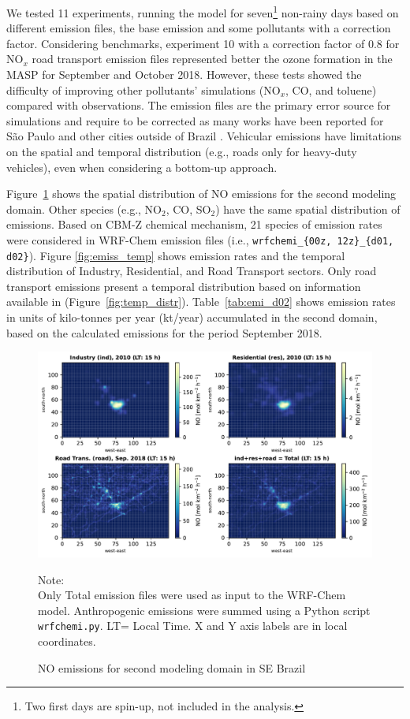    We tested 11 experiments, running the model for seven\footnote{Two first days are spin-up, not included in the analysis.} non-rainy days based on different emission files, the base emission and some pollutants with a correction factor.
   Considering \citet{Emery2017} benchmarks, experiment 10 with a correction factor of 0.8 for NO$_x$ road transport emission files represented better the ozone formation in the MASP for September and October 2018.
   However, these tests showed the difficulty of improving other pollutants' simulations (NO$_x$, CO, and toluene) compared with observations. 
   The emission files are the primary error source for simulations and require to be corrected as many works have been reported for S\~{a}o Paulo and other cities outside of Brazil \citep{Russell2000, Holnicki2015, Andrade2017, Ibarra2020}.
   Vehicular emissions \citep[described in][]{Andrade2015} have limitations on the spatial and temporal distribution (e.g., roads only for heavy-duty vehicles), even when considering a bottom-up approach.
   
	Figure~\ref{fig:anth_dist} shows the spatial distribution of NO emissions for the second modeling domain.
	Other species (e.g., NO$_2$, CO, SO$_2$) have the same spatial distribution of emissions.
	Based on CBM-Z chemical mechanism, 21  species of emission rates were considered in WRF-Chem emission files (i.e., \verb|wrfchemi_{00z, 12z}_{d01, d02}|).
	Figure \ref{fig:emiss_temp} shows emission rates and the temporal distribution of Industry, Residential, and Road Transport sectors. 
	Only road transport emissions present a temporal distribution based on information available in \citet{Andrade2015} (Figure~\ref{fig:temp_distr}).
	Table~\ref{tab:emi_d02} shows emission rates in units of kilo-tonnes per year (kt/year) accumulated in the second domain, based on the calculated emissions for the period September 2018.
	
	\begin{figure}[htb]
		\begin{center}
			\includegraphics[width=.9\textwidth]{fig/E_NO_emi_d02.pdf}
		\end{center}
  		\caption{NO emissions for second modeling domain in SE Brazil}
  		{\scriptsize Note:\\ Only Total emission files were used as input to the WRF-Chem model. Anthropogenic emissions were summed using a Python script \verb|wrfchemi.py|. LT= Local Time. X and Y axis labels are in  local coordinates.}
  		\label{fig:anth_dist}
	\end{figure}
	
